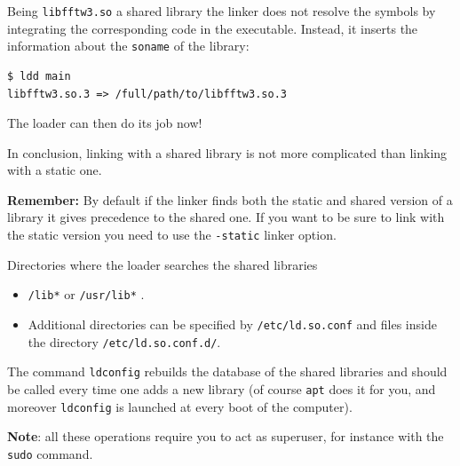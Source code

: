 \documentclass[10pt,aspectratio=169]{beamer}
\begin{document}
\begin{frame}[fragile]

  Being \texttt{libfftw3.so} a shared library the linker does not
  resolve the symbols by integrating the corresponding code in the
  executable. Instead, it inserts the information about the
  \texttt{soname} of the library:
  \smallskip

\begin{verbatim}
$ ldd main
libfftw3.so.3 => /full/path/to/libfftw3.so.3
\end{verbatim}
\smallskip
The loader can then do its job now!
\smallskip

In conclusion, linking with a shared library is not more complicated
than linking with a static one.
\medskip

\textbf{Remember:} By default if the linker finds both the static and
shared version of a library it gives precedence to the shared
one. If you want to be sure to link with the static version you need to use 
the \texttt{-static} linker option.
\end{frame}

\begin{frame}{Directories where the loader searches the shared libraries}  
	
	\begin{itemize}
		\item  \texttt{/lib*} or  \texttt{/usr/lib*} .
		\item Additional directories can be specified by \texttt{/etc/ld.so.conf} and files inside the directory \texttt{/etc/ld.so.conf.d/}.
	\end{itemize}


  The command \texttt{ldconfig} rebuilds the database of the shared
  libraries and should be called every time one adds a new library (of
  course \texttt{apt} does it for you, and moreover
  \texttt{ldconfig} is launched at every boot of the computer).
  \smallskip

  \textbf{Note}: all these operations require you to act as superuser, for
  instance with the \texttt{sudo} command.
\end{frame}
\end{document}
